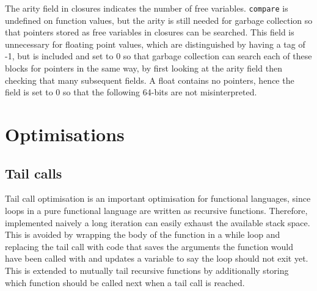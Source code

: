 The arity field in closures indicates the number of free variables. \verb|compare| is undefined on function values, but the arity is still needed for garbage collection so that pointers stored as free variables in closures can be searched. This field is unnecessary for floating point values, which are distinguished by having a tag of -1, but is included and set to 0 so that garbage collection can search each of these blocks for pointers in the same way, by first looking at the arity field then checking that many subsequent fields. A float contains no pointers, hence the field is set to 0 so that the following 64-bits are not misinterpreted.





\section{Optimisations}
\subsection{Tail calls}
Tail call optimisation is an important optimisation for functional languages, since loops in a pure functional language are written as recursive functions. Therefore, implemented naively a long iteration can easily exhaust the available stack space. This is avoided by wrapping the body of the function in a while loop and replacing the tail call with code that saves the arguments the function would have been called with and updates a variable to say the loop should not exit yet. This is extended to mutually tail recursive functions by additionally storing which function should be called next when a tail call is reached.

